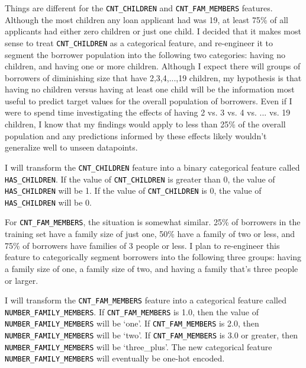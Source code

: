 \documentclass[12pt, letterpaper]{article}
\begin{document}
Things are different for the \colorbox{backcolor}{\textcolor{black}{\texttt{CNT_CHILDREN}}} and \colorbox{backcolor}{\textcolor{black}{\texttt{CNT_FAM_MEMBERS}}} features. Although the most children any loan applicant had was 19, at least 75\% of all applicants had either zero children or just one child. I decided that it makes most sense to treat  \colorbox{backcolor}{\textcolor{black}{\texttt{CNT_CHILDREN}}} as a categorical feature, and re-engineer it to segment the borrower population into the following two categories: having no children, and having one or more children. Although I expect there will groups of borrowers of diminishing size that have 2,3,4,...,19 children, my hypothesis is that having no children versus having at least one child will be the information most useful to predict target values for the overall population of borrowers. Even if I were to spend time investigating the effects of having 2 vs. 3 vs. 4 vs. ... vs. 19 children, I know that my findings would apply to less than 25\% of the overall population and any predictions informed by these effects likely wouldn't generalize well to unseen datapoints.

I will transform the \colorbox{backcolor}{\textcolor{black}{\texttt{CNT_CHILDREN}}} feature into a binary categorical feature called \colorbox{backcolor}{\textcolor{black}{\texttt{HAS_CHILDREN}}}. If the value of \colorbox{backcolor}{\textcolor{black}{\texttt{CNT_CHILDREN}}} is greater than 0, the value of \colorbox{backcolor}{\textcolor{black}{\texttt{HAS_CHILDREN}}} will be 1. If the value of \colorbox{backcolor}{\textcolor{black}{\texttt{CNT_CHILDREN}}} is 0, the value of \colorbox{backcolor}{\textcolor{black}{\texttt{HAS_CHILDREN}}} will be 0.

For \colorbox{backcolor}{\textcolor{black}{\texttt{CNT_FAM_MEMBERS}}}, the situation is somewhat similar. 25\% of borrowers in the training set have a family size of just one, 50\% have a family of two or less, and 75\% of borrowers have families of 3 people or less. I plan to re-engineer this feature to categorically segment borrowers into the following three groups: having a family size of one, a family size of two, and having a family that's three people or larger.

I will transform the \colorbox{backcolor}{\textcolor{black}{\texttt{CNT_FAM_MEMBERS}}} feature into a categorical feature called \colorbox{backcolor}{\textcolor{black}{\texttt{NUMBER_FAMILY_MEMBERS}}}. If \colorbox{backcolor}{\textcolor{black}{\texttt{CNT_FAM_MEMBERS}}} is 1.0, then the value of \colorbox{backcolor}{\textcolor{black}{\texttt{NUMBER_FAMILY_MEMBERS}}} will be `one'. If \colorbox{backcolor}{\textcolor{black}{\texttt{CNT_FAM_MEMBERS}}} is 2.0, then \colorbox{backcolor}{\textcolor{black}{\texttt{NUMBER_FAMILY_MEMBERS}}} will be `two'. If \colorbox{backcolor}{\textcolor{black}{\texttt{CNT_FAM_MEMBERS}}} is 3.0 or greater, then \colorbox{backcolor}{\textcolor{black}{\texttt{NUMBER_FAMILY_MEMBERS}}} will be `three_plus'. The new categorical feature \colorbox{backcolor}{\textcolor{black}{\texttt{NUMBER_FAMILY_MEMBERS}}} will eventually be one-hot encoded.
\end{document}
